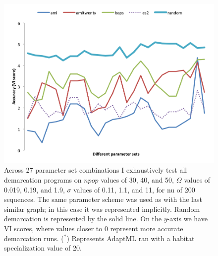 \begin{figure}[h!]
  \centering
    \includegraphics[scale=0.75]{images/ResultGraphs/ResultGraphs-1}
      \caption[All demarcation graphical accuracy visualization on $nu = 200$.]{Across 27 parameter set combinations I exhaustively test all demarcation programs on $npop$ values of 30, 40, and 50, $\Omega$ values of 0.019, 0.19, and 1.9, $\sigma$ values of 0.11, 1.1, and 11, for nu of 200 sequences. The same parameter scheme was used as with the last similar graph; in this case it was represented implicitly. Random demarcation is represented by the solid line. On the $y$-axis we have VI scores, where values closer to 0 represent more accurate demarcation runs.  ($^\ast$) Represents AdaptML ran with a habitat specialization value of 20.}
    \label{fig:All200}
\end{figure}


